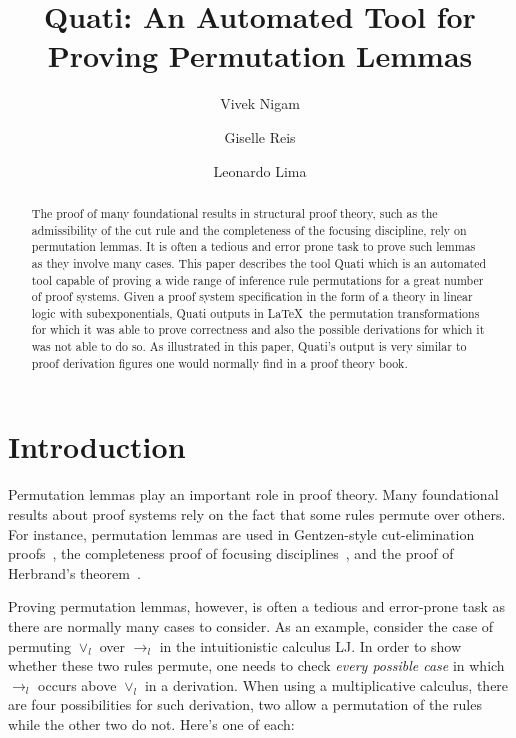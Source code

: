 \documentclass{llncs}
\title{Quati: An Automated Tool for Proving Permutation Lemmas}
\author{Vivek Nigam\inst{1} \and Giselle Reis\inst{2} \and Leonardo Lima\inst{1}}
\institute{Universidade Federal da Para\'{i}ba, Brazil
\and Technische Universit\"{a}t Wien, Austria
}
\begin{document}
\maketitle

\begin{abstract}
The proof of many foundational results in structural proof theory, such as the
admissibility of the cut rule and the completeness of the focusing discipline,
rely on permutation lemmas. It is often a tedious and error prone task to prove
such lemmas as they involve many cases. This paper describes the tool Quati
which is an automated tool capable of proving a wide range of inference rule
permutations for a great number of proof systems. Given a proof system
specification in the form of a theory in linear logic with subexponentials,
Quati outputs in \LaTeX\ the permutation transformations for which it was able
to prove correctness and also the 
possible derivations for which it was not able to do so. As illustrated in this
paper, Quati's output is very similar to proof derivation figures one would
normally find in a proof theory book. 
\end{abstract}

\vspace{-2mm}
\section{Introduction}

Permutation lemmas play an important role in proof theory. Many foundational
results about proof systems rely on the fact that some rules
permute over others. For instance, permutation lemmas are used in Gentzen-style 
cut-elimination proofs~\cite{gentzen35}, 
the completeness proof of focusing disciplines~\cite{andreoli92jlc,miller07cslb}, 
and the proof of Herbrand's theorem~\cite{herbrand30phd}.

Proving permutation lemmas, however, is often a tedious and error-prone task as there are normally many 
cases to consider. As an example, consider the case of permuting $\vee_l$ over $\rightarrow_l$ in
the intuitionistic calculus LJ. In order to show whether these two
rules permute, one needs to check \emph{every possible case} in which
$\rightarrow_l$ occurs above $\vee_l$ in a derivation. When using a
multiplicative calculus, there are four possibilities for such derivation, two
allow a permutation of the rules while the other two do not.
Here's one of each:
\vspace{-4mm}
\end{document}

